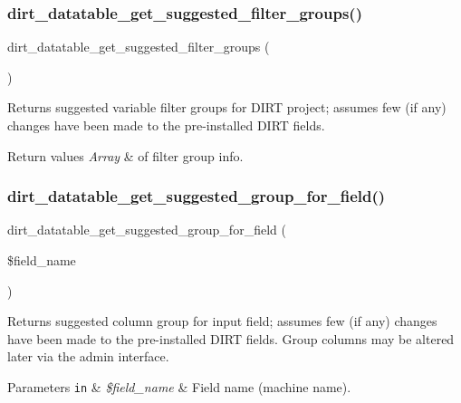 \subsubsection{\texorpdfstring{dirt\+\_\+datatable\+\_\+get\+\_\+suggested\+\_\+filter\+\_\+groups()}{dirt\_datatable\_get\_suggested\_filter\_groups()}}
{\footnotesize\ttfamily dirt\+\_\+datatable\+\_\+get\+\_\+suggested\+\_\+filter\+\_\+groups (\begin{DoxyParamCaption}{ }\end{DoxyParamCaption})}

Returns suggested variable filter groups for D\+I\+RT project; assumes few (if any) changes have been made to the pre-\/installed D\+I\+RT fields.


\begin{DoxyRetVals}{Return values}
{\em Array} & of filter group info. \\
\hline
\end{DoxyRetVals}
\mbox{\label{dirt__datatable_8table__schema_8inc_ab527de6cffbcf5664354269dacc6757f}} 
\subsubsection{\texorpdfstring{dirt\+\_\+datatable\+\_\+get\+\_\+suggested\+\_\+group\+\_\+for\+\_\+field()}{dirt\_datatable\_get\_suggested\_group\_for\_field()}}
{\footnotesize\ttfamily dirt\+\_\+datatable\+\_\+get\+\_\+suggested\+\_\+group\+\_\+for\+\_\+field (\begin{DoxyParamCaption}\item[{}]{\$field\+\_\+name }\end{DoxyParamCaption})}

Returns suggested column group for input field; assumes few (if any) changes have been made to the pre-\/installed D\+I\+RT fields. Group columns may be altered later via the admin interface.


\begin{DoxyParams}[1]{Parameters}
\mbox{\tt in}  & {\em \$field\+\_\+name} & Field name (machine name).\\
\hline
\end{DoxyParams}

